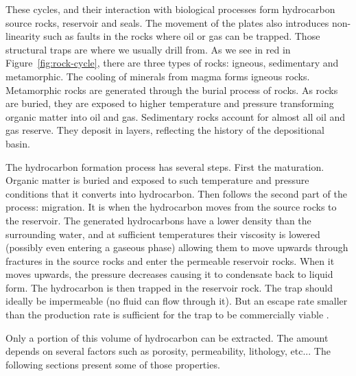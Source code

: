 These cycles, and their interaction with biological processes form hydrocarbon source rocks, reservoir and seals. The movement of the plates also introduces non-linearity such as faults in the rocks where oil or gas can be trapped. Those structural traps are where we usually drill from. As we see in red in Figure~\ref{fig:rock-cycle}, there are three types of rocks: igneous, sedimentary and metamorphic. The cooling of minerals from magma  forms  igneous rocks. Metamorphic rocks are generated through  the burial process of rocks. As rocks are buried, they are exposed to higher temperature and pressure transforming organic matter into oil and gas. Sedimentary rocks account for almost all oil and gas reserve. They deposit in layers, reflecting the history of the depositional basin.


The hydrocarbon formation process has several steps. First the maturation. Organic matter is buried and exposed to such temperature and pressure conditions that it converts into hydrocarbon. Then follows the second part of the process: migration. It is when the hydrocarbon moves from the source rocks to the reservoir. The generated hydrocarbons have a lower density than the surrounding water, and at sufficient temperatures their viscosity is lowered (possibly even entering a gaseous phase) allowing them to move upwards through fractures in the source rocks and enter the permeable reservoir rocks. When it moves upwards, the pressure decreases causing it to condensate back to liquid form. The hydrocarbon is then trapped in the reservoir rock. The trap should ideally be impermeable (no fluid can flow through it). But an escape rate smaller than the production rate is sufficient for the trap to be commercially viable \cite{oilbegin}. 

Only a portion of this volume of hydrocarbon can be extracted. The amount depends on several factors such as porosity, permeability, lithology, etc...  The following sections present some of those properties. 
